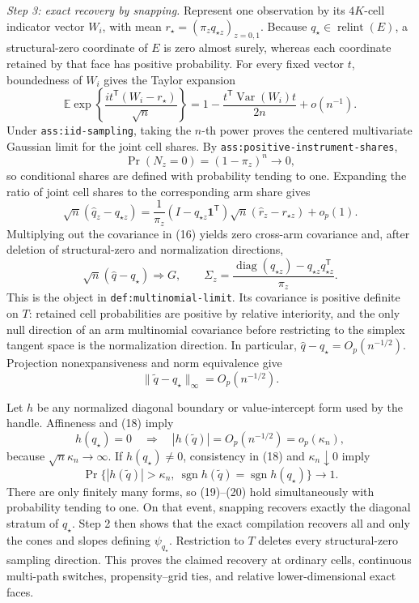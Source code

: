 \emph{Step 3: exact recovery by snapping.}
Represent one observation by its \(4K\)-cell indicator vector \(W_i\), with mean \(r_\star=(\pi_zq_{\star z})_{z=0,1}\).  Because \(q_\star\in\operatorname{relint}(E)\), a structural-zero coordinate of \(E\) is zero almost surely, whereas each coordinate retained by that face has positive probability.  For every fixed vector \(t\), boundedness of \(W_i\) gives the Taylor expansion
\[
 \mathbb E\exp\!\left\{\frac{i t^{\mathsf T}(W_i-r_\star)}{\sqrt n}\right\}
 =1-\frac{t^{\mathsf T}\operatorname{Var}(W_i)t}{2n}+o(n^{-1}).
\tag{14}
\]
Under \texttt{ass:iid-sampling}, taking the \(n\)-th power proves the centered multivariate Gaussian limit for the joint cell shares.  By \texttt{ass:positive-instrument-shares},
\[
 \Pr(N_z=0)=(1-\pi_z)^n\longrightarrow0,
\tag{15}
\]
so conditional shares are defined with probability tending to one.  Expanding the ratio of joint cell shares to the corresponding arm share gives
\[
 \sqrt n(\widehat q_z-q_{\star z})
 =\frac{1}{\pi_z}
  (I-q_{\star z}\mathbf 1^{\mathsf T})
  \sqrt n(\widehat r_z-r_{\star z})+o_p(1).
\tag{16}
\]
Multiplying out the covariance in (16) yields zero cross-arm covariance and, after deletion of structural-zero and normalization directions,
\[
 \sqrt n(\widehat q-q_\star)\Rightarrow G,
 \qquad
 \Sigma_z=\frac{\operatorname{diag}(q_{\star z})
                  -q_{\star z}q_{\star z}^{\mathsf T}}{\pi_z}.
\tag{17}
\]
This is the object in \texttt{def:multinomial-limit}.  Its covariance is positive definite on \(T\): retained cell probabilities are positive by relative interiority, and the only null direction of an arm multinomial covariance before restricting to the simplex tangent space is the normalization direction.  In particular, \(\widehat q-q_\star=O_p(n^{-1/2})\).  Projection nonexpansiveness and norm equivalence give
\[
 \|\widetilde q-q_\star\|_\infty
 =O_p(n^{-1/2}).
\tag{18}
\]

Let \(h\) be any normalized diagonal boundary or value-intercept form used by the handle.  Affineness and (18) imply
\[
 h(q_\star)=0
 \quad\Longrightarrow\quad
 |h(\widetilde q)|=O_p(n^{-1/2})=o_p(\kappa_n),
\tag{19}
\]
because \(\sqrt n\kappa_n\to\infty\).  If \(h(q_\star)\neq0\), consistency in (18) and \(\kappa_n\downarrow0\) imply
\[
 \Pr\{|h(\widetilde q)|>\kappa_n,\ 
 \operatorname{sgn}h(\widetilde q)=\operatorname{sgn}h(q_\star)\}
 \longrightarrow1.
\tag{20}
\]
There are only finitely many forms, so (19)--(20) hold simultaneously with probability tending to one.  On that event, snapping recovers exactly the diagonal stratum of \(q_\star\).  Step 2 then shows that the exact compilation recovers all and only the cones and slopes defining \(\psi_{q_\star}\).  Restriction to \(T\) deletes every structural-zero sampling direction.  This proves the claimed recovery at ordinary cells, continuous multi-path switches, propensity--grid ties, and relative lower-dimensional exact faces.

